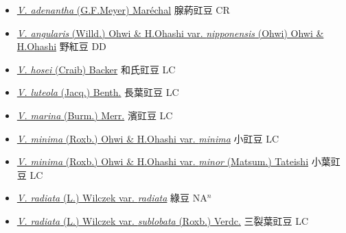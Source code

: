 \begin{itemize}
  \begin{itemize}
        \item[] \href{http://www.theplantlist.org/tpl1.1/search?q=Vigna+adenantha}{\textit{V. adenantha} (G.F.Meyer) Maréchal}   腺葯豇豆 CR
        \item[] \href{http://www.theplantlist.org/tpl1.1/search?q=Vigna+angularis+var.+nipponensis}{\textit{V. angularis} (Willd.) Ohwi \& H.Ohashi var. \textit{nipponensis} (Ohwi) Ohwi \& H.Ohashi}   野紅豆 DD
        \item[] \href{http://www.theplantlist.org/tpl1.1/search?q=Vigna+hosei}{\textit{V. hosei} (Craib) Backer}   和氏豇豆 LC
        \item[] \href{http://www.theplantlist.org/tpl1.1/search?q=Vigna+luteola}{\textit{V. luteola} (Jacq.) Benth.}   長葉豇豆 LC
        \item[] \href{http://www.theplantlist.org/tpl1.1/search?q=Vigna+marina}{\textit{V. marina} (Burm.) Merr.}   濱豇豆 LC
        \item[] \href{http://www.theplantlist.org/tpl1.1/search?q=Vigna+minima+var.+minima}{\textit{V. minima} (Roxb.) Ohwi \& H.Ohashi var. \textit{minima}}   小豇豆 LC
        \item[] \href{http://www.theplantlist.org/tpl1.1/search?q=Vigna+minima+var.+minor}{\textit{V. minima} (Roxb.) Ohwi \& H.Ohashi var. \textit{minor} (Matsum.) Tateishi}   小葉豇豆 LC
        \item[] \href{http://www.theplantlist.org/tpl1.1/search?q=Vigna+radiata+var.+radiata}{\textit{V. radiata} (L.) Wilczek var. \textit{radiata}}   綠豆 NA$^n$
        \item[] \href{http://www.theplantlist.org/tpl1.1/search?q=Vigna+radiata+var.+sublobata}{\textit{V. radiata} (L.) Wilczek var. \textit{sublobata} (Roxb.) Verdc.}   三裂葉豇豆 LC

\end{itemize}
\end{itemize}
